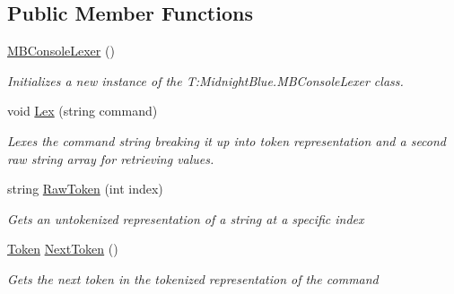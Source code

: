 \subsection*{Public Member Functions}
\begin{DoxyCompactItemize}
\item 
\hyperlink{class_m_b2_d_1_1_m_b_console_lexer_aa78375766c0612494a148a55814b4b7e}{M\+B\+Console\+Lexer} ()
\begin{DoxyCompactList}\small\item\em Initializes a new instance of the T\+:\+Midnight\+Blue.\+M\+B\+Console\+Lexer class. \end{DoxyCompactList}\item 
void \hyperlink{class_m_b2_d_1_1_m_b_console_lexer_a6c09fcdb1a36eff50201b9f5469bd55c}{Lex} (string command)
\begin{DoxyCompactList}\small\item\em Lexes the command string breaking it up into token representation and a second raw string array for retrieving values. \end{DoxyCompactList}\item 
string \hyperlink{class_m_b2_d_1_1_m_b_console_lexer_a9f08e0a2739eb027f6b8c46abe67f647}{Raw\+Token} (int index)
\begin{DoxyCompactList}\small\item\em Gets an untokenized representation of a string at a specific index \end{DoxyCompactList}\item 
\hyperlink{namespace_m_b2_d_ab170e7e7db86e5ccb0ae156c0d9a6002}{Token} \hyperlink{class_m_b2_d_1_1_m_b_console_lexer_ab083ced0d68a7f7278fbb462a9c60410}{Next\+Token} ()
\begin{DoxyCompactList}\small\item\em Gets the next token in the tokenized representation of the command \end{DoxyCompactList}\end{DoxyCompactItemize}
